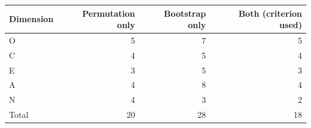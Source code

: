 \begin{tabular}{lrrr}
\toprule
Dimension & Permutation only & Bootstrap only & Both (criterion used) \\
\midrule
O & 5 & 7 & 5 \\
C & 4 & 5 & 4 \\
E & 3 & 5 & 3 \\
A & 4 & 8 & 4 \\
N & 4 & 3 & 2 \\
\midrule
Total & 20 & 28 & 18 \\
\bottomrule
\end{tabular}
